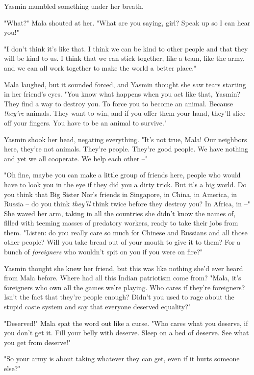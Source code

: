 Yasmin mumbled something under her breath.

"What?" Mala shouted at her. "What are you saying, girl? Speak up
so I can hear you!"

"I don't think it's like that. I think we can be kind to other
people and that they will be kind to us. I think that we can stick
together, like a team, like the army, and we can all work together
to make the world a better place."

Mala laughed, but it sounded forced, and Yasmin thought she saw
tears starting in her friend's eyes. "You know what happens when
you act like that, Yasmin? They find a way to destroy you. To force
you to become an animal. Because \emph{they're} animals. They want
to win, and if you offer them your hand, they'll slice off your
fingers. You have to be an animal to survive."

Yasmin shook her head, negating everything. "It's not true, Mala!
Our neighbors here, they're not animals. They're people. They're
good people. We have nothing and yet we all cooperate. We help each
other --"

"Oh fine, maybe you can make a little group of friends here, people
who would have to look you in the eye if they did you a dirty
trick. But it's a big world. Do you think that Big Sister Nor's
friends in Singapore, in China, in America, in Russia -- do you
think \emph{they'll} think twice before they destroy you? In
Africa, in --" She waved her arm, taking in all the countries she
didn't know the names of, filled with teeming masses of predatory
workers, ready to take their jobs from them. "Listen: do you really
care so much for Chinese and Russians and all those other people?
Will you take bread out of your mouth to give it to them? For a
bunch of \emph{foreigners} who wouldn't spit on you if you were on
fire?"

Yasmin thought she knew her friend, but this was like nothing she'd
ever heard from Mala before. Where had all this Indian patriotism
come from? "Mala, it's foreigners who own all the games we're
playing. Who cares if they're foreigners? Isn't the fact that
they're people enough? Didn't you used to rage about the stupid
caste system and say that everyone deserved equality?"

"Deserved!" Mala spat the word out like a curse. "Who cares what
you deserve, if you don't get it. Fill your belly with deserve.
Sleep on a bed of deserve. See what you get from deserve!"

"So your army is about taking whatever they can get, even if it
hurts someone else?"

